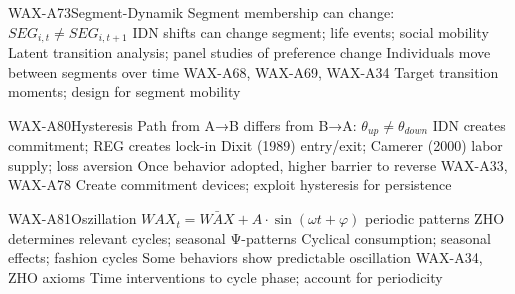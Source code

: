 
\begin{axiomspec}{WAX-A73}{Segment-Dynamik}
 Segment membership can change: $SEG_{i,t} \neq SEG_{i,t+1}$
 IDN shifts can change segment; life events; social mobility
 Latent transition analysis; panel studies of preference change
 Individuals move between segments over time
 WAX-A68, WAX-A69, WAX-A34
 Target transition moments; design for segment mobility
\end{axiomspec}


\begin{axiomspec}{WAX-A80}{Hysteresis}
 Path from A→B differs from B→A: $\theta_{up} \neq \theta_{down}$
 IDN creates commitment; REG creates lock-in
 Dixit (1989) entry/exit; Camerer (2000) labor supply; loss aversion
 Once behavior adopted, higher barrier to reverse
 WAX-A33, WAX-A78
 Create commitment devices; exploit hysteresis for persistence
\end{axiomspec}


\begin{axiomspec}{WAX-A81}{Oszillation}
 $WAX_t = \bar{WAX} + A \cdot \sin(\omega t + \varphi)$ periodic patterns
 ZHO determines relevant cycles; seasonal Ψ-patterns
 Cyclical consumption; seasonal effects; fashion cycles
 Some behaviors show predictable oscillation
 WAX-A34, ZHO axioms
 Time interventions to cycle phase; account for periodicity
\end{axiomspec}


